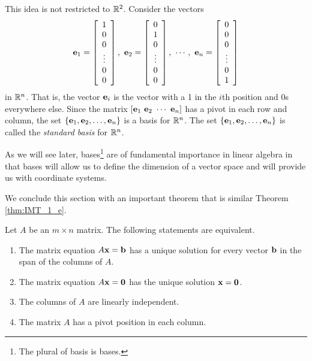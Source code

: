This idea is not restricted to $\mathbb{R}^2$. Consider the vectors 
\[\mathbf{e}_1 = \left[ \begin{array}{c} 1\\0\\0 \\ \vdots \\ 0 \\ 0 \end{array} \right], \ \mathbf{e}_2 = \left[ \begin{array}{c} 0\\1\\0 \\ \vdots \\ 0 \\ 0 \end{array} \right], \ \cdots, \ \mathbf{e}_n = \left[ \begin{array}{c} 0\\0\\0 \\ \vdots \\ 0 \\ 1 \end{array} \right]\]
in $\mathbb{R}^n$. That is, the vector $\mathbf{e}_i$ is the vector with a 1 in the $i$th position and 0s everywhere else. Since the matrix $[\mathbf{e}_1 \ \mathbf{e}_2 \ \cdots \ \mathbf{e}_n]$ has a pivot in each row and column, the set $\{\mathbf{e}_1, \mathbf{e}_2, \ldots, \mathbf{e}_n\}$ is a basis for $\mathbb{R}^n$. The set $\{\mathbf{e}_1, \mathbf{e}_2, \ldots, \mathbf{e}_n\}$ is called the \emph{standard basis} for $\mathbb{R}^n$. 

As we will see later, bases\footnote{The plural of basis is bases.} are of fundamental importance in linear algebra in that bases will allow us to define the dimension of a vector space and will provide us with coordinate systems.   

We conclude this section with an important theorem that is similar Theorem \ref{thm:IMT_1_e}. 



\begin{theorem} \label{thm:IMT_1_f} Let $A$ be an $m \times n$ matrix. The following statements are equivalent.
    \begin{enumerate}
    \item The matrix equation $A \mathbf{x} = \mathbf{b}$ has a unique solution for every vector $\mathbf{b}$ in the span of the columns of $A$.
    \item The matrix equation $A \mathbf{x} = \mathbf{0}$ has the unique solution $\mathbf{x} = \mathbf{0}$.
    \item The columns of $A$ are linearly independent.
    \item The matrix $A$ has a pivot position in each column. 
    \end{enumerate}
\end{theorem}





